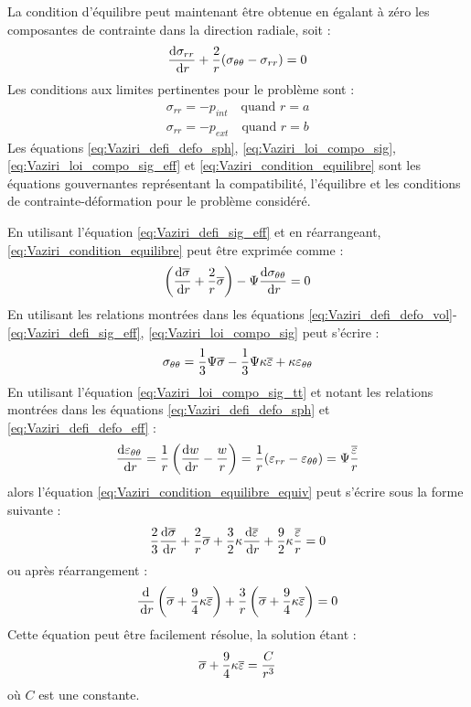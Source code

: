 \documentclass[10pt]{book}
\begin{document}
La condition d'équilibre peut maintenant être obtenue en égalant à zéro les composantes de contrainte dans la direction radiale, soit :
\begin{equation}
\frac{\mathrm{d}\sigma_{rr}}{\,\mathrm{d}r} + \frac{2}{r}(\sigma_{\theta\theta} - \sigma_{rr}) = 0
\label{eq:Vaziri_condition_equilibre}
\end{equation}
Les conditions aux limites pertinentes pour le problème sont :
\begin{align}\label{eq:Vaziri_BCs_int}
\sigma_{rr} = -p_{int} \quad \text{quand } r = a\\\label{eq:Vaziri_BCs_ext}
\sigma_{rr} = -p_{ext} \quad \text{quand } r = b
\end{align}
Les équations \eqref{eq:Vaziri_defi_defo_sph}, \eqref{eq:Vaziri_loi_compo_sig}, \eqref{eq:Vaziri_loi_compo_sig_eff} et \eqref{eq:Vaziri_condition_equilibre} sont les équations gouvernantes représentant la compatibilité, l'équilibre et les conditions de contrainte-déformation pour le problème considéré.

En utilisant l'équation \eqref{eq:Vaziri_defi_sig_eff} et en réarrangeant, \eqref{eq:Vaziri_condition_equilibre} peut être exprimée comme :
\begin{equation}
\left(\frac{\mathrm{d}\overline{\sigma}}{\,\mathrm{d}r} + \frac{2}{r}\overline{\sigma}\right) - \Psi\frac{\mathrm{d}\sigma_{\theta\theta}}{\,\mathrm{d}r} = 0
\label{eq:Vaziri_condition_equilibre_equiv}
\end{equation}
En utilisant les relations montrées dans les équations \eqref{eq:Vaziri_defi_defo_vol}-\eqref{eq:Vaziri_defi_sig_eff}, \eqref{eq:Vaziri_loi_compo_sig} peut s'écrire :
\begin{equation}
\sigma_{\theta\theta} = \frac{1}{3}\Psi\overline{\sigma} - \frac{1}{3}\Psi \kappa\overline{\varepsilon} + \kappa\varepsilon_{\theta\theta}
\label{eq:Vaziri_loi_compo_sig_tt}
\end{equation}
En utilisant l'équation \eqref{eq:Vaziri_loi_compo_sig_tt} et notant les relations montrées dans les équations \eqref{eq:Vaziri_defi_defo_sph} et \eqref{eq:Vaziri_defi_defo_eff} :
$$\frac{\mathrm{d}\varepsilon_{\theta\theta}}{\,\mathrm{d}r} = \frac{1}{r}\left(\frac{\mathrm{d} w}{\,\mathrm{d}r} - \frac{w}{r}\right) = \frac{1}{r}(\varepsilon_{rr} - \varepsilon_{\theta\theta}) = \Psi\frac{\overline{\varepsilon}}{r}$$
alors l'équation \eqref{eq:Vaziri_condition_equilibre_equiv} peut s'écrire sous la forme suivante :
$$\frac{2}{3}\frac{\mathrm{d}\overline{\sigma}}{\,\mathrm{d}r} + \frac{2}{r}\overline{\sigma} + \frac{3}{2}\kappa\frac{\mathrm{d}\overline{\varepsilon}}{\,\mathrm{d}r} + \frac{9}{2}\kappa\frac{\overline{\varepsilon}}{r} = 0$$
ou après réarrangement :
$$\frac{\mathrm{d}}{\,\mathrm{d}r}\left(\overline{\sigma} + \frac{9}{4}\kappa\overline{\varepsilon}\right) + \frac{3}{r}\left(\overline{\sigma} + \frac{9}{4}\kappa\overline{\varepsilon}\right) = 0$$
Cette équation peut être facilement résolue, la solution étant :
\begin{equation}
\overline{\sigma} + \frac{9}{4}\kappa\overline{\varepsilon} = \frac{C}{r^3}
\label{eq:Vaziri_sol_sig_eff}
\end{equation}
où $C$ est une constante.
\end{document}
